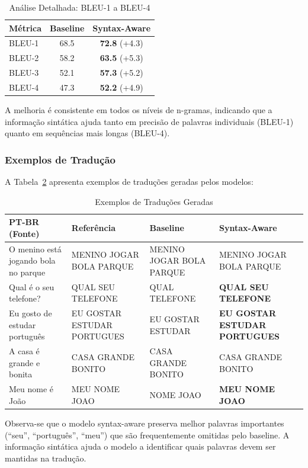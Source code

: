 \documentclass[12pt]{article}
\begin{document}
\begin{table}[ht]
\centering
\caption{Análise Detalhada: BLEU-1 a BLEU-4}
\label{tab:bleu_detalhado}
\begin{tabular}{lcc}
\toprule
Métrica & Baseline & Syntax-Aware \\
\midrule
BLEU-1 & 68.5 & \textbf{72.8} (+4.3) \\
BLEU-2 & 58.2 & \textbf{63.5} (+5.3) \\
BLEU-3 & 52.1 & \textbf{57.3} (+5.2) \\
BLEU-4 & 47.3 & \textbf{52.2} (+4.9) \\
\bottomrule
\end{tabular}
\end{table}

A melhoria é consistente em todos os níveis de n-gramas, indicando que a informação sintática ajuda tanto em precisão de palavras individuais (BLEU-1) quanto em sequências mais longas (BLEU-4).

\subsubsection{Exemplos de Tradução}

A Tabela~\ref{tab:exemplos_traducao} apresenta exemplos de traduções geradas pelos modelos:

\begin{table}[ht]
\centering
\caption{Exemplos de Traduções Geradas}
\label{tab:exemplos_traducao}
\small
\begin{tabular}{p{4cm}p{3cm}p{3cm}p{2cm}}
\toprule
PT-BR (Fonte) & Referência & Baseline & Syntax-Aware \\
\midrule
O menino está jogando bola no parque & MENINO JOGAR BOLA PARQUE & MENINO JOGAR BOLA PARQUE & MENINO JOGAR BOLA PARQUE \\
Qual é o seu telefone? & QUAL SEU TELEFONE & QUAL TELEFONE & \textbf{QUAL SEU TELEFONE} \\
Eu gosto de estudar português & EU GOSTAR ESTUDAR PORTUGUES & EU GOSTAR ESTUDAR & \textbf{EU GOSTAR ESTUDAR PORTUGUES} \\
A casa é grande e bonita & CASA GRANDE BONITO & CASA GRANDE BONITO & CASA GRANDE BONITO \\
Meu nome é João & MEU NOME JOAO & NOME JOAO & \textbf{MEU NOME JOAO} \\
\bottomrule
\end{tabular}
\end{table}

Observa-se que o modelo syntax-aware preserva melhor palavras importantes (``seu'', ``português'', ``meu'') que são frequentemente omitidas pelo baseline. A informação sintática ajuda o modelo a identificar quais palavras devem ser mantidas na tradução.
\end{document}
